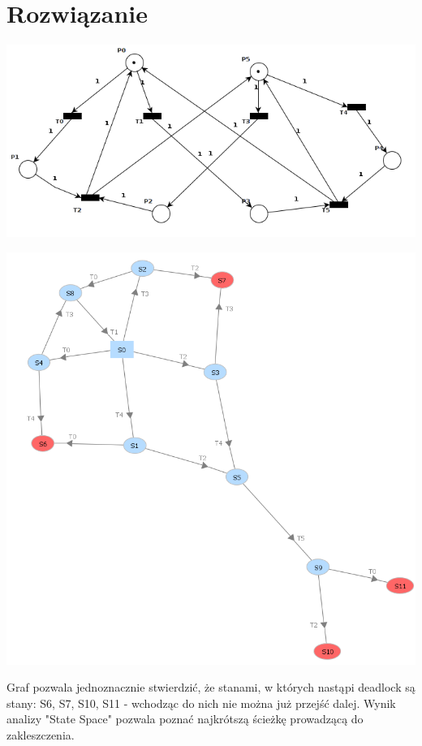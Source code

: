 \documentclass[12pt]{article}
\begin{document}
\section{Rozwiązanie}
\begin{center}
\centering
    \includegraphics{zad6_init.png}
\end{center}
\begin{center}
\centering
    \includegraphics{zad6_reach.png}
\end{center}
Graf pozwala jednoznacznie stwierdzić, że stanami, w których nastąpi deadlock są stany: S6, S7, S10, S11 - wchodząc do nich nie można już przejść dalej. Wynik analizy "State Space" pozwala poznać najkrótszą ścieżkę prowadzącą do zakleszczenia.
\end{document}
